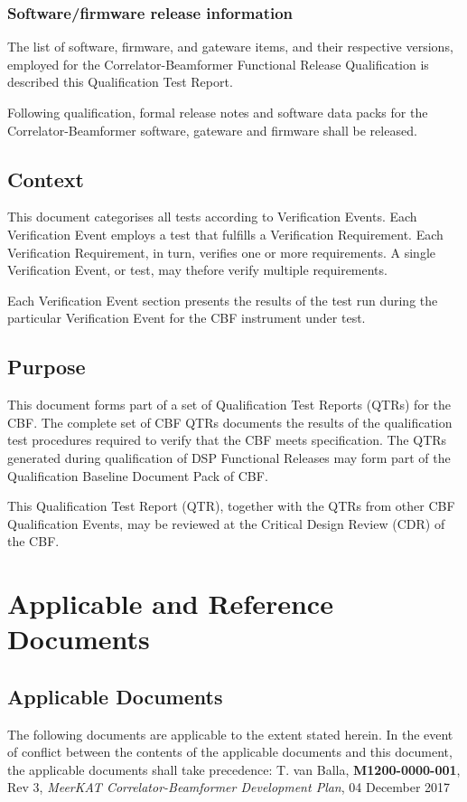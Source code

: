 \subsection{Software/firmware release information}
The list of software, firmware, and gateware items, and their respective versions, employed for the Correlator-Beamformer Functional Release Qualification is described this Qualification Test Report.

Following qualification, formal release notes and software data packs for the Correlator-Beamformer software, gateware and firmware shall be released.
\section{Context}
This document categorises all tests according to Verification Events. Each Verification Event employs a test that fulfills a Verification Requirement. Each Verification Requirement, in turn, verifies one or more requirements. A single Verification Event, or test, may thefore verify multiple requirements.

Each Verification Event section presents the results of the test run during the particular Verification Event for the CBF instrument under test.
\section{Purpose}
This document forms part of a set of Qualification Test Reports (QTRs) for the
CBF. The complete set of CBF QTRs documents the results of the qualification
test procedures required to verify that the CBF meets specification. The QTRs
generated during qualification of DSP Functional Releases may form part of the
Qualification Baseline Document Pack of CBF.\newline

This Qualification Test Report (QTR), together with the QTRs from other CBF Qualification Events, may be reviewed at the Critical Design Review (CDR) of the CBF.
\chapter{Applicable and Reference Documents}
\section{Applicable Documents}
The following documents are applicable to the extent stated herein. In the event of conflict between the contents of the applicable documents and this document, the applicable documents shall take precedence:\newline\newline
[1]\hspace{10mm} T. van Balla, {\bf M1200-0000-001}, Rev 3, {\it MeerKAT Correlator-Beamformer Development Plan}, 04 December 2017\newline\

